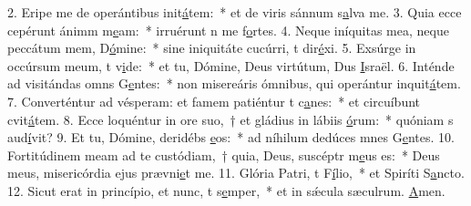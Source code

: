 2. Eripe me de operántibus init\uline{á}tem:~* et de viris sánnum s\uline{a}lva me.
3. Quia ecce cepérunt ánimm m\uline{e}am:~* irruérunt n me f\uline{o}rtes.
4. Neque iníquitas mea, neque peccátum mem, D\uline{ó}mine:~* sine iniquitáte cucúrri, t dir\uline{é}xi.
5. Exsúrge in occúrsum meum, t v\uline{i}de:~* et tu, Dómine, Deus virtútum, Dus \uline{I}sraël.
6. Inténde ad visitándas omns G\uline{e}ntes:~* non misereáris ómnibus, qui operántur inquit\uline{á}tem.
7. Converténtur ad vésperam: et famem patiéntur t c\uline{a}nes:~* et circuíbunt cvit\uline{á}tem.
8. Ecce loquéntur in ore suo,~† et gládius in lábiis \uline{ó}rum:~* quóniam s aud\uline{í}vit?
9. Et tu, Dómine, deridébs \uline{e}os:~* ad níhilum dedúces mnes G\uline{e}ntes.
10. Fortitúdinem meam ad te custódiam,~† quia, Deus, suscéptr m\uline{e}us es:~* Deus meus, misericórdia ejus prævni\uline{e}t me.
11. Glória Patri, t F\uline{í}lio,~* et Spiríti S\uline{a}ncto.
12. Sicut erat in princípio, et nunc, t s\uline{e}mper,~* et in sǽcula sæculrum. \uline{A}men.

